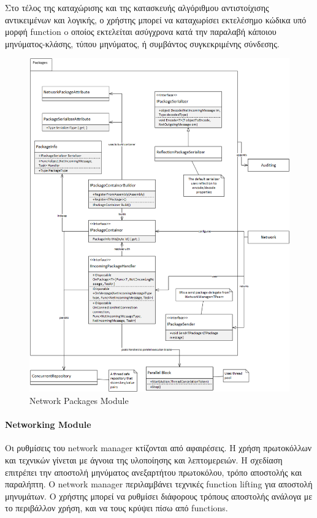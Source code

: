 \documentclass[oneside, 12pt]{book}
\begin{document}
			Στο τέλος της καταχώρισης και της κατασκευής αλγόριθμου αντιστοίχισης αντικειμένων και λογικής, ο χρήστης μπορεί να καταχωρίσει εκτελέσημο κώδικα υπό μορφή function o οποίος εκτελείται ασύγχρονα κατά την παραλαβή κάποιου μηνύματος-κλάσης, τύπου μηνύματος, ή συμβάντος συγκεκριμένης σύνδεσης.
			
			\begin{figure}
				\centering
				\includegraphics[width=165mm]{Images/network_architecture_packages}
				\caption{Network Packages Module}
				\label{network_packages}
			\end{figure}	
					
			\paragraph{Networking Module}	 					
			
			Οι ρυθμίσεις του network manager κτίζονται από αφαιρέσεις. Η χρήση πρωτοκόλλων και τεχνικών γίνεται με άγνοια της υλοποίησης και λεπτομερειών.
			Η σχεδίαση επιτρέπει την αποστολή μηνύματος ανεξαρτήτου πρωτοκόλου, τρόπο αποστολής και παραλήπτη. Ο network manager περιλαμβάνει τεχνικές function lifting για αποστολή μηνυμάτων. Ο χρήστης μπορεί να ρυθμίσει διάφορους τρόπους αποστολής ανάλογα με το περιβάλλον χρήση, και να τους κρύψει πίσω από functions. 
						
\end{document}
